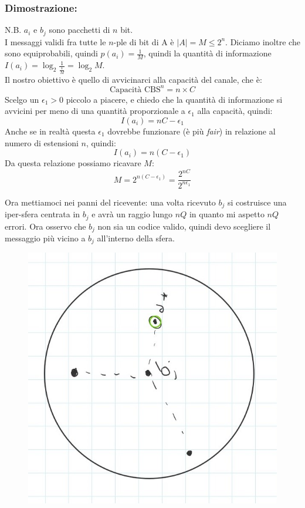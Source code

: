 \subsubsection*{Dimostrazione:}
N.B. $a_i$ e $b_j$ sono pacchetti di $n$ bit.\\
I messaggi validi fra tutte le $n$-ple di bit di A è $|A|=M\leq 2^n$. Diciamo inoltre che sono equiprobabili, quindi $p(a_i) = \frac1M$, quindi la quantità di informazione $I(a_i) = \log_2\frac{1}{\frac1M} = \log_2M$.\\
Il nostro obiettivo è quello di avvicinarci alla capacità del canale, che è:
\begin{equation*}
\text{Capacità CBS}^n = n \times C
\end{equation*}
Scelgo un $\epsilon_1 > 0$ piccolo a piacere, e chiedo che la quantità di informazione si avvicini per meno di una quantità proporzionale a $\epsilon_1$ alla capacità, quindi:
\begin{equation*}
I(a_i)=nC - \epsilon_1
\end{equation*}
Anche se in realtà questa $\epsilon_1$ dovrebbe funzionare (è più \textit{fair}) in relazione al numero di estensioni $n$, quindi:
\begin{equation*}
I(a_i)=n(C - \epsilon_1)
\end{equation*}
Da questa relazione possiamo ricavare $M$:
\begin{equation*}
M = 2^{n(C-\epsilon_1)} = \frac{2^{nC}}{2^{n\epsilon_1}}
\end{equation*}

Ora mettiamoci nei panni del ricevente: una volta ricevuto $b_j$ si costruisce una iper-sfera centrata in $b_j$ e avrà un raggio lungo $nQ$ in quanto mi aspetto $nQ$ errori.
Ora osservo che $b_j$ non sia un codice valido, quindi devo scegliere il messaggio più vicino a $b_j$ all'interno della sfera.

\begin{figure}[h]
	\centering
	\includegraphics[width=0.45\linewidth]{immagini/img30}
\end{figure}

